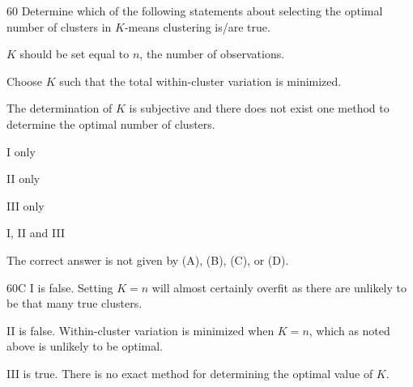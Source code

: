 \begin{question}{60}
Determine which of the following statements about selecting the optimal number of clusters in $K$-means clustering is/are true.

\begin{statements}
\item $K$ should be set equal to $n$, the number of observations.
\item Choose $K$ such that the total within-cluster variation is minimized.
\item The determination of $K$ is subjective and there does not exist one method to determine the optimal number of clusters.
\end{statements}

\begin{choices}
\item I only
\item II only
\item III only
\item I, II and III
\item The correct answer is not given by (A), (B), (C), or (D).
\end{choices}
\end{question}
\begin{solution}{60}{C}
I is false. Setting $K = n$ will almost certainly overfit as there are unlikely to be that many true clusters.

II is false. Within-cluster variation is minimized when $K = n$, which as noted above is unlikely to be optimal.

III is true. There is no exact method for determining the optimal value of $K$.
\end{solution}


